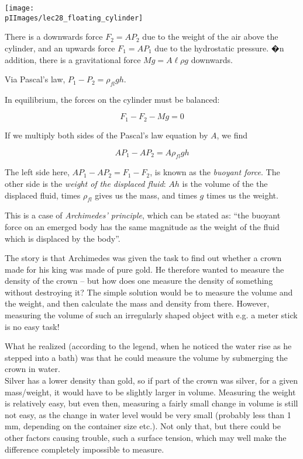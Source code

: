 \begin{center}
\texttt{[image: \\pIImages/lec28\_floating\_cylinder]}
\end{center}

There is a downwards force $F_2 = A P_2$ due to the weight of the air above the cylinder, and an upwards force $F_1 = A P_1$ due to the hydrostatic pressure. �n addition, there is a gravitational force $M g = A \ell \rho g$ downwards.

Via Pascal's law, $P_1 - P_2 = \rho_{fl} g h$.

In equilibrium, the forces on the cylinder must be balanced:

\begin{equation}
F_1 - F_2 - M g = 0
\end{equation}

If we multiply both sides of the Pascal's law equation by $A$, we find

\begin{equation}
A P_1 - A P_2 = A \rho_{fl} g h
\end{equation}

The left side here, $A P_1 - A P_2 = F_1 - F_2$, is known as the \emph{buoyant force}. The other side is the \emph{weight of the displaced fluid}: $A h$ is the volume of the the displaced fluid, times $\rho_{fl}$ gives us the mass, and times $g$ times us the weight.

This is a case of \emph{Archimedes' principle}, which can be stated as: ``the buoyant force on an emerged body has the same magnitude as the weight of the fluid which is displaced by the body''.

The story is that Archimedes was given the task to find out whether a crown made for his king was made of pure gold. He therefore wanted to measure the density of the crown -- but how does one measure the density of something without destroying it? The simple solution would be to measure the volume and the weight, and then calculate the mass and density from there. However, measuring the volume of such an irregularly shaped object with e.g. a meter stick is no easy task!

What he realized (according to the legend, when he noticed the water rise as he stepped into a bath) was that he could measure the volume by submerging the crown in water.\\
Silver has a lower density than gold, so if part of the crown was silver, for a given mass/weight, it would have to be slightly larger in volume. Measuring the weight is relatively easy, but even then, measuring a fairly small change in volume is still not easy, as the change in water level would be very small (probably less than 1 mm, depending on the container size etc.). Not only that, but there could be other factors causing trouble, such a surface tension, which may well make the difference completely impossible to measure.


